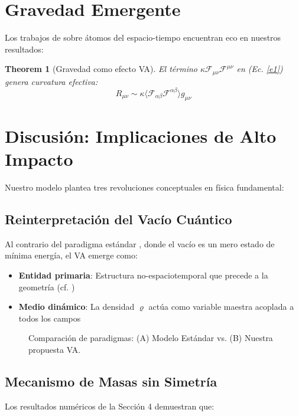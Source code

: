 \documentclass[twoside]{article}
\newtheorem{theorem}{Theorem}[section]
\theoremstyle{definition}
\theoremstyle{remark}
\numberwithin{equation}{section}
\theoremstyle{definition}
\theoremstyle{example}
\theoremstyle{remark}
\numberwithin{equation}{section}%
\begin{document}
		\section{Gravedad Emergente}
		Los trabajos de \cite{Padmanabhan2016} sobre átomos del espacio-tiempo encuentran eco en nuestros resultados:
		
		\begin{theorem}[Gravedad como efecto VA]
			El término $\kappa \mathcal{F}_{\mu\nu} \mathcal{F}^{\mu\nu}$ en (Ec. \ref{e1}) genera curvatura efectiva:
			\begin{equation}
				R_{\mu\nu} \sim \kappa \langle \mathcal{F}_{\alpha\beta}\mathcal{F}^{\alpha\beta} \rangle g_{\mu\nu}
			\end{equation}
		\end{theorem}
		
		
		\section{Discusión: Implicaciones de Alto Impacto}
		
		Nuestro modelo plantea tres revoluciones conceptuales en física fundamental:
		
		\subsection{Reinterpretación del Vacío Cuántico}
		Al contrario del paradigma estándar \cite{Wilczek2013}, donde el vacío es un mero estado de mínima energía, el VA emerge como:
		
		\begin{itemize}
			\item \textbf{Entidad primaria}: Estructura no-espaciotemporal que precede a la geometría (cf. \cite{Anderson2012})
			\item \textbf{Medio dinámico}: La densidad $\varrho$ actúa como variable maestra acoplada a todos los campos
		\end{itemize}
		
		\begin{figure}[H]
			\centering
			\caption{Comparación de paradigmas: (A) Modelo Estándar vs. (B) Nuestra propuesta VA.}
			\label{fig:paradigma}
		\end{figure}
		
		\subsection{Mecanismo de Masas sin Simetría}
		Los resultados numéricos de la Sección 4 demuestran que:
		
\end{document}
